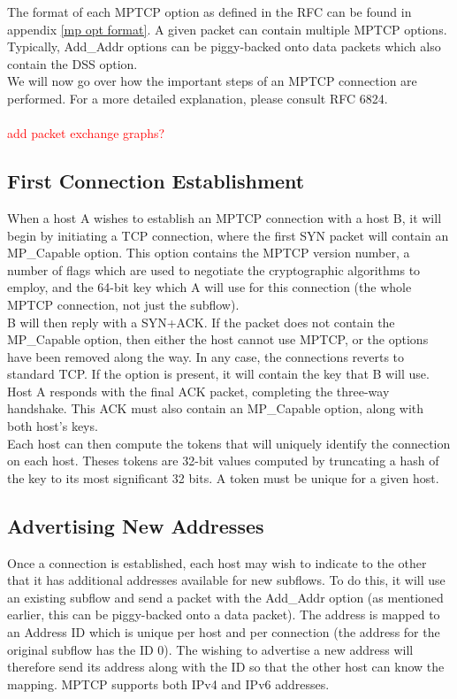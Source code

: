\documentclass[12pt, a4paper, oneside]{article} %
\begin{document}
The format of each MPTCP option as defined in the RFC can be found in appendix \ref{mp opt format}. A given packet can contain multiple MPTCP options. Typically, Add\_Addr options can be piggy-backed onto data packets which also contain the DSS option.\\

We will now go over how the important steps of an MPTCP connection are performed. For a more detailed explanation, please consult RFC 6824.\\ \\


\textcolor{red}{add packet exchange graphs?}


\subsection{First Connection Establishment}
When a host A wishes to establish an MPTCP connection with a host B, it will begin by initiating a TCP connection, where the first SYN packet will contain an MP\_Capable option. This option contains the MPTCP version number, a number of flags which are used to negotiate the cryptographic algorithms to employ, and the 64-bit key which A will use for this connection (the whole MPTCP connection, not just the subflow). \\

B will then reply with a SYN+ACK. If the packet does not contain the MP\_Capable option, then either the host cannot use MPTCP, or the options have been removed along the way. In any case, the connections reverts to standard TCP. If the option is present, it will contain the key that B will use. Host A responds with the final ACK packet, completing the three-way handshake. This ACK must also contain an MP\_Capable option, along with both host's keys. \\

Each host can then compute the tokens that will uniquely identify the connection on each host. Theses tokens are 32-bit values computed by truncating a hash of the key to its most significant 32 bits. A token must be unique for a given host.

\subsection{Advertising New Addresses}
Once a connection is established, each host may wish to indicate to the other that it has additional addresses available for new subflows. To do this, it will use an existing subflow and send a packet with the Add\_Addr option (as mentioned earlier, this can be piggy-backed onto a data packet). The address is mapped to an Address ID which is unique per host and per connection (the address for the original subflow has the ID 0). The wishing to advertise a new address will therefore send its address along with the ID so that the other host can know the mapping. MPTCP supports both IPv4 and IPv6 addresses. \\
\end{document}
